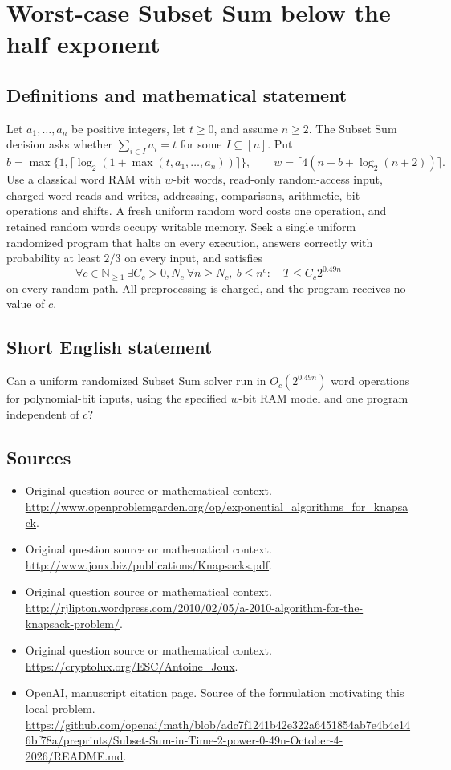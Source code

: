 \documentclass[11pt]{article}
\begin{document}
\section*{Worst-case Subset Sum below the half exponent}\label{30007476}
\subsection{Definitions and mathematical statement}
Let $a_1,\ldots,a_n$ be positive integers, let $t\ge0$, and assume $n\ge2$. The Subset Sum decision asks whether $\sum_{i\in I}a_i=t$ for some $I\subseteq[n]$. Put
\[
 b=\max\{1,\lceil\log_2(1+\max(t,a_1,\ldots,a_n))\rceil\},\qquad
 w=\lceil4(n+b+\log_2(n+2))\rceil.
\]
Use a classical word RAM with $w$-bit words, read-only random-access input, charged word reads and writes, addressing, comparisons, arithmetic, bit operations and shifts. A fresh uniform random word costs one operation, and retained random words occupy writable memory. Seek a single uniform randomized program that halts on every execution, answers correctly with probability at least $2/3$ on every input, and satisfies
\[
 \forall c\in\mathbb N_{\ge1}\ \exists C_c>0,N_c\ \forall n\ge N_c,\ b\le n^c:\quad
 T\le C_c2^{0.49n}
\]
on every random path. All preprocessing is charged, and the program receives no value of $c$.

\subsection{Short English statement}
Can a uniform randomized Subset Sum solver run in $O_c(2^{0.49n})$ word operations for polynomial-bit inputs, using the specified $w$-bit RAM model and one program independent of $c$?

\subsection{Sources}
\begin{itemize}
\item[S1] Original question source or mathematical context.
\url{http://www.openproblemgarden.org/op/exponential_algorithms_for_knapsack}.
\item[S2] Original question source or mathematical context.
\url{http://www.joux.biz/publications/Knapsacks.pdf}.
\item[S3] Original question source or mathematical context.
\url{http://rjlipton.wordpress.com/2010/02/05/a-2010-algorithm-for-the-knapsack-problem/}.
\item[S4] Original question source or mathematical context.
\url{https://cryptolux.org/ESC/Antoine_Joux}.
\item[S5] OpenAI, manuscript citation page. Source of the formulation motivating this local problem.
\url{https://github.com/openai/math/blob/adc7f1241b42e322a6451854ab7e4b4c146bf78a/preprints/Subset-Sum-in-Time-2-power-0-49n-October-4-2026/README.md}.
\end{itemize}
\end{document}
